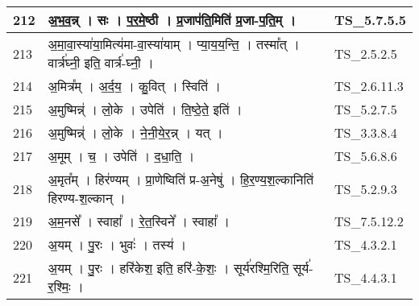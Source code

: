\documentclass[17pt]{extarticle}
\begin{document}
\begin{longtable}{||p{0.4in}||p{4.9in}||p{0.9in}||}
    \hline
        
    212 & अ॒भ॒व॒न्न्   ।   सः   ।   प॒र॒मे॒ष्ठी   ।   प्र॒जाप॑ति॒मिति॑ प्र॒जा{-}प॒ति॒म्   ।    & TS\_5.7.5.5       \\
    
    \hline
        
    213 & अ॒मा॒वा॒स्या॑या॒मित्य॑मा{-}वा॒स्या॑याम्   ।   प्या॒य॒य॒न्ति॒   ।   तस्मा᳚त्   ।   वार्त्र॑घ्नी॒ इति॒ वार्त्र॑{-}घ्नी॒   ।    & TS\_2.5.2.5       \\
    
    \hline
        
    214 & अ॒मित्र᳚म्   ।   अ॒र्द॒य॒   ।   कु॒वित्   ।   स्विति॑   ।    & TS\_2.6.11.3       \\
    
    \hline
        
    215 & अ॒मुष्मिन्न्॑   ।   लो॒के   ।   उपेति॑   ।   ति॒ष्ठे॒ते॒ इति॑   ।    & TS\_5.2.7.5       \\
    
    \hline
        
    216 & अ॒मुष्मिन्न्॑   ।   लो॒के   ।   ने॒नी॒ये॒र॒न्न्   ।   यत्   ।    & TS\_3.3.8.4       \\
    
    \hline
        
    217 & अ॒मूम्   ।   च॒   ।   उपेति॑   ।   द॒धा॒ति॒   ।    & TS\_5.6.8.6       \\
    
    \hline
        
    218 & अ॒मृत᳚म्   ।   हिर॑ण्यम्   ।   प्रा॒णेष्विति॑ प्र{-}अ॒नेषु॑   ।   हि॒र॒ण्य॒श॒ल्कानिति॑ हिरण्य{-}श॒ल्कान्   ।    & TS\_5.2.9.3       \\
    
    \hline
        
    219 & अ॒म॒नसे᳚   ।   स्वाहा᳚   ।   रे॒त॒स्विने᳚   ।   स्वाहा᳚   ।    & TS\_7.5.12.2       \\
    
    \hline
        
    220 & अ॒यम्   ।   पु॒रः   ।   भुवः॑   ।   तस्य॑   ।    & TS\_4.3.2.1       \\
    
    \hline
        
    221 & अ॒यम्   ।   पु॒रः   ।   हरि॑केश॒ इति॒ हरि॑{-}के॒शः॒   ।   सूर्य॑रश्मि॒रिति॒ सूर्य॑{-}र॒श्मिः॒   ।    & TS\_4.4.3.1       \\
    
    \hline
        

\end{longtable}
\end{document}
